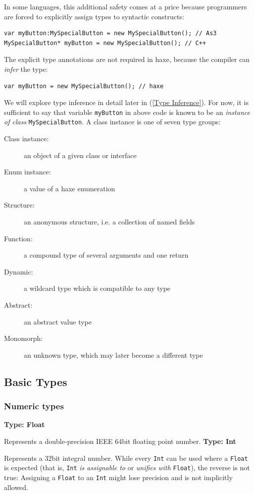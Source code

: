 \documentclass{article}
\newcommand{\type}[1]{\texttt{#1}}
\newcommand{\expr}[1]{\texttt{#1}}
\newenvironment{myshaded}
  {\def\FrameCommand{\fboxsep=\topsep\colorbox{bgcolor}}%
  \MakeFramed {\advance\hsize-\width \FrameRestore}}%
 {\endMakeFramed}
\newcommand{\define}[3][Definition]
	{\begin{myshaded}\noindent\textbf{#1: #2}\par\nobreak\noindent\ignorespaces#3\label{def:#2}\end{myshaded}}
\newcommand{\fullref}[1]{\nameref{#1} (\cref{#1})}
\begin{document}
In some languages, this additional safety comes at a price because programmers are forced to explicitly assign types to syntactic constructs:

\begin{lstlisting}
var myButton:MySpecialButton = new MySpecialButton(); // As3
MySpecialButton* myButton = new MySpecialButton(); // C++ 
\end{lstlisting}
The explicit type annotations are not required in haxe, because the compiler can \emph{infer} the type:

\begin{lstlisting}
var myButton = new MySpecialButton(); // haxe
\end{lstlisting}
We will explore type inference in detail later in \fullref{Type Inference}. For now, it is sufficient to say that variable \expr{myButton} in above code is known to be an \emph{instance of class} \type{MySpecialButton}. A class instance is one of seven type groups:

\begin{description}
 \item[Class instance:] an object of a given class or interface
 \item[Enum instance:] a value of a haxe enumeration
 \item[Structure:] an anonymous structure, i.e. a collection of named fields
 \item[Function:] a compound type of several arguments and one return
 \item[Dynamic:] a wildcard type which is compatible to any type
 \item[Abstract:] an abstract value type
 \item[Monomorph:] an unknown type, which may later become a different type
\end{description}




\subsection{Basic Types}
\label{Basic Types}
\subsubsection{Numeric types}
\label{Numeric types}

\define[Type]{Float}{Represents a double-precision IEEE 64bit floating point number.}
\define[Type]{Int}{Represents a 32bit integral number.}
While every \type{Int} can be used where a \type{Float} is expected (that is, \type{Int} \emph{is assignable to} or \emph{unifies with} \type{Float}), the reverse is not true: Assigning a \type{Float} to an \type{Int} might lose precision and is not implicitly allowed.
\end{document}
